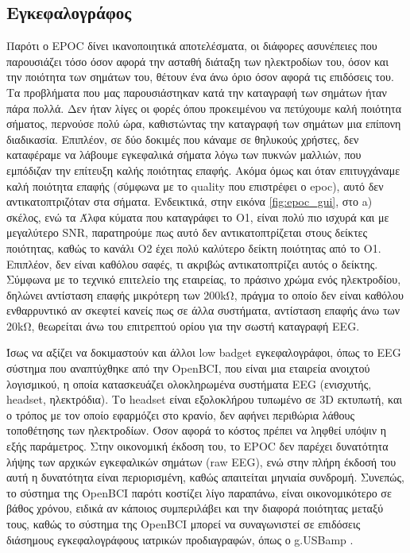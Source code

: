 \documentclass[11pt,a4paper,english,greek,twoside]{../Thesis}
\begin{document}
\subsection{Εγκεφαλογράφος}

Παρότι ο EPOC δίνει ικανοποιητικά αποτελέσματα, οι διάφορες ασυνέπειες που παρουσιάζει τόσο όσον αφορά την ασταθή διάταξη των ηλεκτροδίων του, όσον και την ποιότητα των σημάτων του, θέτουν ένα άνω όριο όσον αφορά τις επιδόσεις του. Τα προβλήματα που μας παρουσιάστηκαν κατά την καταγραφή των σημάτων ήταν πάρα πολλά. Δεν ήταν λίγες οι φορές όπου προκειμένου να πετύχουμε καλή ποιότητα σήματος, περνούσε πολύ ώρα, καθιστώντας την καταγραφή των σημάτων μια επίπονη διαδικασία. Επιπλέον, σε δύο δοκιμές που κάναμε σε θηλυκούς χρήστες, δεν καταφέραμε να λάβουμε εγκεφαλικά σήματα λόγω των πυκνών μαλλιών, που εμπόδιζαν την επίτευξη καλής ποιότητας επαφής. Ακόμα όμως και όταν επιτυγχάναμε καλή ποιότητα επαφής (σύμφωνα με το quality που επιστρέφει ο epoc), αυτό δεν αντικατοπτριζόταν στα σήματα. Ενδεικτικά, στην εικόνα \ref{fig:epoc_gui}, στο a) σκέλος, ενώ τα Άλφα κύματα που καταγράφει το O1, είναι πολύ πιο ισχυρά και με μεγαλύτερο SNR, παρατηρούμε πως αυτό δεν αντικατοπτρίζεται στους δείκτες ποιότητας, καθώς το κανάλι O2 έχει πολύ καλύτερο δείκτη ποιότητας από το O1. Επιπλέον, δεν είναι καθόλου σαφές, τι ακριβώς αντικατοπτρίζει αυτός ο δείκτης. Σύμφωνα με το τεχνικό επιτελείο της εταιρείας, το πράσινο χρώμα ενός ηλεκτροδίου, δηλώνει αντίσταση επαφής μικρότερη των 200kΩ, πράγμα το οποίο δεν είναι καθόλου ενθαρρυντικό αν σκεφτεί κανείς πως σε άλλα συστήματα, αντίσταση επαφής άνω των 20kΩ, θεωρείται άνω του επιτρεπτού ορίου για την σωστή καταγραφή EEG.
\par Ίσως να αξίζει να δοκιμαστούν και άλλοι low badget εγκεφαλογράφοι, όπως το EEG σύστημα που αναπτύχθηκε από την OpenBCI, που είναι μια εταιρεία ανοιχτού λογισμικού, η οποία κατασκευάζει ολοκληρωμένα συστήματα EEG (ενισχυτής, headset, ηλεκτρόδια). Το headset είναι εξολοκλήρου τυπωμένο σε 3D εκτυπωτή, και ο τρόπος με τον οποίο εφαρμόζει στο κρανίο, δεν αφήνει περιθώρια λάθους τοποθέτησης των ηλεκτροδίων. Όσον αφορά το κόστος πρέπει να ληφθεί υπόψιν η εξής παράμετρος. Στην οικονομική έκδοση του, το EPOC δεν παρέχει δυνατότητα λήψης των αρχικών εγκεφαλικών σημάτων (raw EEG), ενώ στην πλήρη έκδοσή του αυτή η δυνατότητα είναι περιορισμένη, καθώς απαιτείται μηνιαία συνδρομή. Συνεπώς, το σύστημα της OpenBCI παρότι κοστίζει λίγο παραπάνω, είναι οικονομικότερο σε βάθος χρόνου, ειδικά αν κάποιος συμπεριλάβει και την διαφορά ποιότητας μεταξύ τους, καθώς το σύστημα της OpenBCI μπορεί να συναγωνιστεί σε επιδόσεις διάσημους εγκεφαλογράφους ιατρικών προδιαγραφών, όπως ο g.USBamp \cite{Frey2016-fx}.
\end{document}
